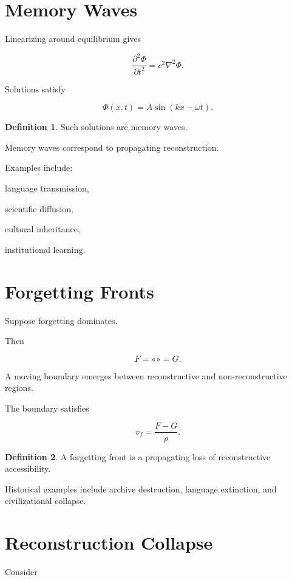 \documentclass[12pt,oneside]{book}
\theoremstyle{plain} \newtheorem{theorem}{Theorem}[chapter] \newtheorem{lemma}[theorem]{Lemma} \newtheorem{proposition}[theorem]{Proposition} \newtheorem{corollary}[theorem]{Corollary}
\theoremstyle{definition} \newtheorem{definition}[theorem]{Definition} \newtheorem{axiom}[theorem]{Axiom} \newtheorem{construction}[theorem]{Construction}
\theoremstyle{remark} \newtheorem{remark}[theorem]{Remark} \newtheorem{example}[theorem]{Example}
\begin{document}
\section{Memory Waves}

Linearizing around equilibrium gives

\[
\frac{\partial^2\Phi}{\partial t^2}
=
c^2
\nabla^2\Phi.
\]

Solutions satisfy

\[
\Phi(x,t)
=
A
\sin(kx-\omega t).
\]

\begin{definition}

Such solutions are memory waves.

\end{definition}

Memory waves correspond to propagating reconstruction.

Examples include:

language transmission,

scientific diffusion,

cultural inheritance,

institutional learning.

\section{Forgetting Fronts}

Suppose forgetting dominates.

Then

\[
F
=
«»
=
G.
\]

A moving boundary emerges between reconstructive and non-reconstructive regions.

The boundary satisfies

\[
v_f
=
\frac{F-G}{\rho}.
\]

\begin{definition}

A forgetting front is a propagating loss of reconstructive accessibility.

\end{definition}

Historical examples include archive destruction, language extinction, and civilizational collapse.

\section{Reconstruction Collapse}

Consider
\end{document}
